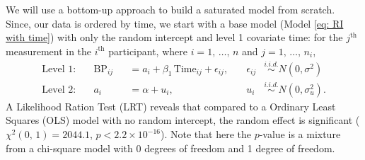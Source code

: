 \documentclass[12pt,twoside,letterpaper]{article}
\theoremstyle{definition}
\theoremstyle{definition}
\begin{document}
We will use a bottom-up approach to build a saturated model from scratch. Since, our data is ordered by time, we start with a base model (Model \ref{eq: RI with time}) with only the random intercept and level 1 covariate time: for the $j^\text{th}$ measurement in the $i^\text{th}$ participant, where $i = 1,\, \ldots,\, n$ and $j = 1,\, \ldots,\, n_i$,
\begin{equation}\label{eq: RI with time}
    \begin{aligned}
        \text{Level 1}: \quad & \text{BP}_{ij} &&= a_i + \beta_1\, \text{Time}_{ij} + \epsilon_{ij}, \quad & \epsilon_{ij} &\overset{i.i.d.}{\sim} N(0, \sigma^2) \\
        \text{Level 2}: \quad & a_i &&= \alpha + u_i, \quad & u_{i} &\overset{i.i.d.}{\sim} N(0, \sigma_u^2).
    \end{aligned}
\end{equation}
A Likelihood Ration Test (LRT) reveals that compared to a Ordinary Least Squares (OLS) model with no random intercept, the random effect is significant ($\chi^2 (0,\, 1) = 2044.1$, $p < 2.2 \times 10^{-16}$). Note that here the $p$-value is a mixture from a chi-square model with 0 degrees of freedom and 1 degree of freedom.
\end{document}
